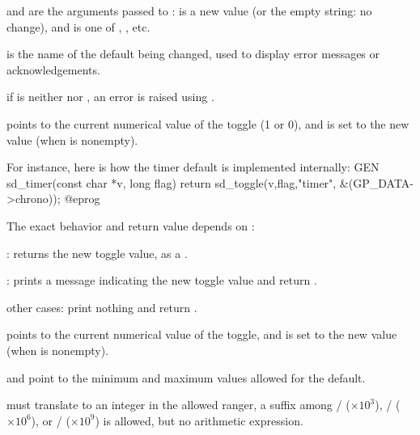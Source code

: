 \item {} and  are the arguments passed to :
 is a new value (or the empty string: no change), and  is one
of , , etc.

\item {} is the name of the default being changed, used to display error
messages or acknowledgements.


\item if  is neither  nor , an error is raised using
.

\item {} points to the current numerical value of the toggle (1 or 0),
and is set to the new value (when  is nonempty).

For instance, here is how the timer default is implemented internally:
\bprog
GEN
sd_timer(const char *v, long flag)
{ return sd_toggle(v,flag,"timer", &(GP_DATA->chrono)); }
@eprog

The exact behavior and return value depends on :

\item {}: returns the new toggle value, as a .

\item {}: prints a message indicating the new toggle value
and return .

\item other cases: print nothing and return .



\item {} points to the current numerical value of the toggle, and is set
to the new value (when  is nonempty).

\item {} and  point to the minimum and maximum values allowed
for the default.

\item {} must translate to an integer in the allowed ranger, a suffix
among
/ ($\times 10^3$),
/ ($\times 10^6$),
or
/ ($\times 10^9$) is allowed, but no arithmetic expression.

